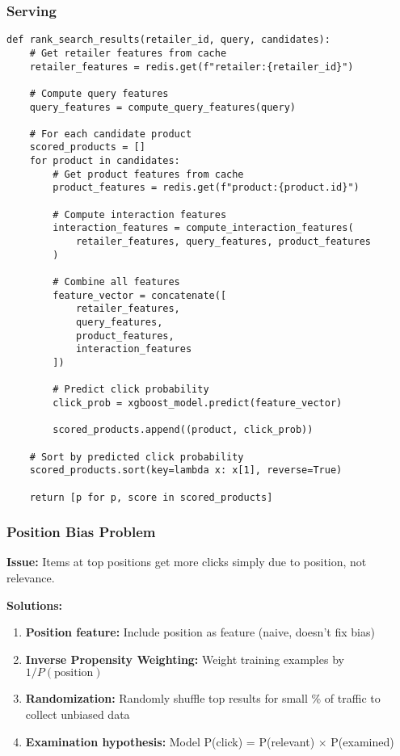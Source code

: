 \documentclass[11pt,letterpaper]{article}
\begin{document}
\subsubsection{Serving}

\begin{lstlisting}
def rank_search_results(retailer_id, query, candidates):
    # Get retailer features from cache
    retailer_features = redis.get(f"retailer:{retailer_id}")

    # Compute query features
    query_features = compute_query_features(query)

    # For each candidate product
    scored_products = []
    for product in candidates:
        # Get product features from cache
        product_features = redis.get(f"product:{product.id}")

        # Compute interaction features
        interaction_features = compute_interaction_features(
            retailer_features, query_features, product_features
        )

        # Combine all features
        feature_vector = concatenate([
            retailer_features,
            query_features,
            product_features,
            interaction_features
        ])

        # Predict click probability
        click_prob = xgboost_model.predict(feature_vector)

        scored_products.append((product, click_prob))

    # Sort by predicted click probability
    scored_products.sort(key=lambda x: x[1], reverse=True)

    return [p for p, score in scored_products]
\end{lstlisting}

\subsubsection{Position Bias Problem}

\textbf{Issue:} Items at top positions get more clicks simply due to position, not relevance.

\textbf{Solutions:}
\begin{enumerate}
    \item \textbf{Position feature:} Include position as feature (naive, doesn't fix bias)
    \item \textbf{Inverse Propensity Weighting:} Weight training examples by $1/P(\text{position})$
    \item \textbf{Randomization:} Randomly shuffle top results for small \% of traffic to collect unbiased data
    \item \textbf{Examination hypothesis:} Model P(click) = P(relevant) $\times$ P(examined)
\end{enumerate}
\end{document}
